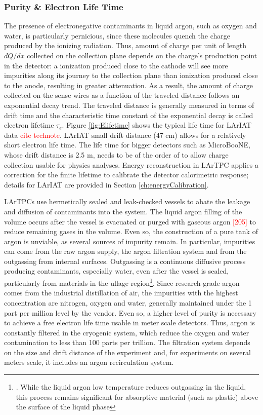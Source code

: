 		
\subsubsection{Purity \& Electron Life Time }
The presence of electronegative contaminants in liquid argon, such as oxygen and water, is particularly
pernicious, since these molecules quench the charge produced by the ionizing radiation.  Thus, amount of charge per unit of length $dQ/dx$ collected on the collection plane depends on the charge's production point in the detector: a ionization produced  close to the cathode will see more impurities along its journey to the collection plane than ionization produced close to the anode, resulting in greater attenuation. As a result,  the amount of charge collected on the sense wires as a function of the traveled distance follows an exponential decay trend. The traveled distance is generally measured in terms of drift time and the  characteristic time constant of the exponential decay is called electron lifetime $\tau_e$. Figure \ref{fig:Elifetime} shows the typical life time for LArIAT data \textcolor{red}{cite technote}. LArIAT small drift distance (47 cm) allows for a relatively short electron life time. The life time for bigger detectors such as MicroBooNE, whose drift distance is 2.5 m, needs to be of the order of  to allow charge collection usable for physics analyses. Energy reconstruction in LArTPC applies a correction for the finite lifetime to calibrate the detector calorimetric response; details for LArIAT are provided in Section \ref{ch:energyCalibration}.

LArTPCs use  hermetically sealed and leak-checked vessels to abate the leakage and diffusion of contaminants into the system. The liquid argon filling of the volume occurs after the vessel is evacuated or purged with gaseous argon \textcolor{red}{[205]} to reduce remaining gases in the volume. Even so, the construction of a pure tank of argon is unviable, as several sources of impurity remain.  In particular, impurities can come from the raw argon supply, the argon filtration system and from the outgassing from internal surfaces. Outgassing is a continuous diffusive process  producing contaminants, especially water, even after the vessel is sealed, particularly from materials in the ullage region\footnote{.  While the liquid argon low temperature reduces outgassing in the liquid, this process remains significant for absorptive material (such as plastic) above the surface of the liquid phase}.  Since research-grade argon comes from the industrial distillation of air, the impurities with the highest concentration are nitrogen, oxygen and water, generally maintained under the 1 part per million level by the vendor.  Even so, a higher level of purity is necessary to achieve a free electron life time usable in meter scale detectors. Thus, argon  is constantly  filtered in the cryogenic system, which reduce the oxygen and water contamination to less than 100 parts per trillion. The filtration system depends on the size and drift distance of the experiment and, for experiments on several meters scale, it includes an argon recirculation system.

